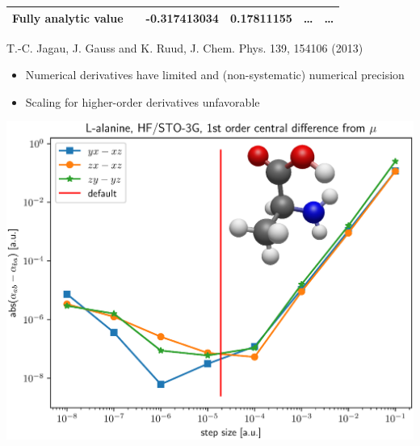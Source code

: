 \documentclass[xcolor=usenames,dvipsnames,svgnames]{beamer}
\begin{document}
\begin{frame}
\begin{table}
\begin{tabular}{llllll}
      Fully analytic value & & -0.317413034 & 0.17811155 & \dots & \dots \\
      \bottomrule
    \end{tabular}
    T.-C. Jagau, J. Gauss and K. Ruud, J. Chem. Phys. 139, 154106 (2013)
  \end{table}
  \begin{itemize}
  \item Numerical derivatives have limited and (non-systematic) numerical precision
  \item Scaling for higher-order derivatives unfavorable
  \end{itemize}
\end{frame}

\begin{frame}
  \centering
  \includegraphics[width=\linewidth,keepaspectratio]{../diff_overlay.eps}
\end{frame}
\end{document}
